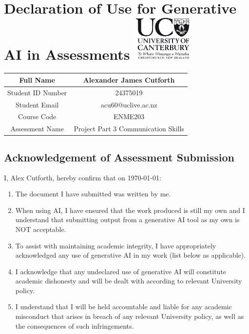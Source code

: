 \documentclass[11pt]{article}
\begin{document}
\section*{Declaration of Use for Generative AI in Assessments \quad \includegraphics[width=30mm]{UCLogo.png}}
\begin{center}

\begin{tabular}{|c|c|}
  \hline
  Full Name & Alexander James Cutforth \\
  \hline
  Student ID Number & 24375019 \\
  \hline
  Student Email & acu60@uclive.ac.nz \\
  \hline
  Course Code & ENME203 \\
  \hline
  Assessment Name & Project Part 3 Communication Skills \\
  \hline
\end{tabular}
\subsection*{Acknowledgement of Assessment Submission}
I, Alex Cutforth, hereby confirm that on \today:
\begin{enumerate}
  \item The document I have submitted was written by me.
  \item When using AI, I have ensured that the work produced is still my own and I understand that submitting output from a generative AI tool as my own is NOT acceptable.
  \item To assist with maintaining academic integrity, I have appropriately acknowledged any use of generative AI in my work (list below as applicable).
  \item I acknowledge that any undeclared use of generative AI will constitute academic dishonesty and will be dealt with according to relevant University policy.
  \item I understand that I will be held accountable and liable for any academic misconduct that arises in breach of any relevant University policy, as well as the consequences of such infringements.
\end{enumerate}

\end{center}
\end{document}
